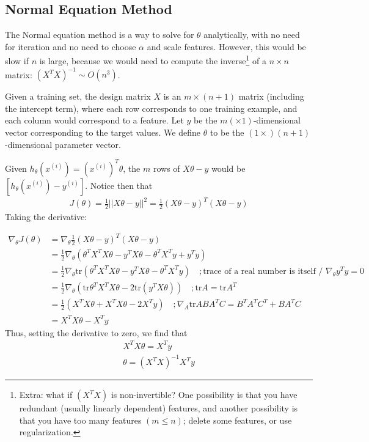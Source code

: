\documentclass[letterpaper,10pt]{article}
\begin{document}
\subsection{Normal Equation Method}

The Normal equation method is a way to solve for $\theta$ analytically, with no need for iteration and no need to choose $\alpha$ and scale features. However, this would be slow if $n$ is large, because we would need to compute the inverse\footnote{Extra: what if $\left( X^T X \right)$ is non-invertible? One possibility is that you have redundant (usually linearly dependent) features, and another possibility is that you have too many features $(m \leq n)$; delete some features, or use regularization.} of a $n\times n$ matrix: $\left( X^T X \right)^{-1} \sim O(n^3)$.

Given a training set, the design matrix $X$ is an $m \times (n+1)$ matrix (including the intercept term), where each row corresponds to one training example, and each column would correspond to a feature. Let $y$ be the $m (\times 1)$-dimensional vector corresponding to the target values. We define $\theta$ to be the $(1 \times) (n+1)$-dimensional parameter vector.

Given $h_\theta(x^{(i)}) = (x^{(i)})^T \theta$, the $m$ rows of $X \theta - y$ would be $[h_\theta(x^{(i)}) - y^{(i)}]$. Notice then that 
\begin{align}
J(\theta) = \frac{1}{2} || X\theta - y ||^2 = \frac{1}{2} (X\theta - y)^T (X\theta - y)
\end{align}
Taking the derivative:

\begin{align}
\nabla_\theta J(\theta) &= \nabla_\theta \frac{1}{2} (X\theta - y)^T (X\theta - y) \\
&=\frac{1}{2} \nabla_\theta  (\theta^TX^TX\theta - y^TX\theta  - \theta^TX^Ty + y^Ty ) \\
&=\frac{1}{2} \nabla_\theta  \text{tr}( \theta^TX^TX\theta - y^TX\theta  - \theta^TX^Ty) \quad ; \text{trace of a real number is itself / $\nabla_\theta y^Ty = 0$}\\
&=\frac{1}{2} \nabla_\theta  (\text{tr} \theta^TX^TX\theta - 2\text{tr}(y^TX\theta)) \quad ; \text{tr}A=\text{tr}A^T \\
&=\frac{1}{2} (X^TX\theta + X^TX\theta - 2X^Ty) \quad ; \nabla_A \text{tr}ABA^TC = B^TA^TC^T + BA^TC \\
&= X^TX\theta - X^Ty
\end{align}
Thus, setting the derivative to zero, we find that
\begin{align}
X^TX\theta = X^Ty \\
\theta = (X^TX)^{-1}X^Ty
\end{align}
\end{document}
